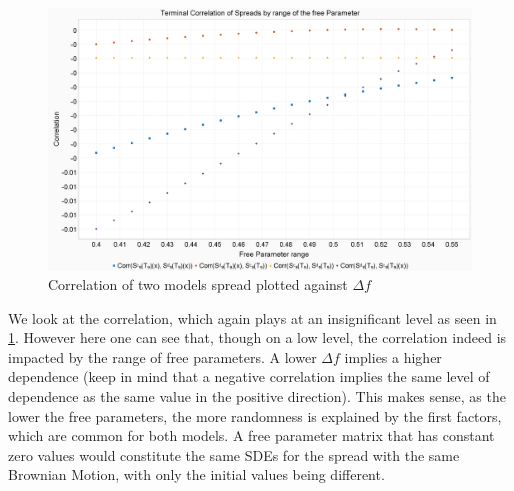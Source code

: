 \documentclass[12pt]{article}
\begin{document}
	\begin{figure}[h!]
		\centering
		\includegraphics[width=0.7\linewidth]{figures/Today/SpreadCorrelationByFreeParameters}
		\caption{Correlation of two models spread plotted against $\Delta f$}
		\label{fig:spreadcorrelationbyfreeparameters}
	\end{figure}
	We look at the correlation, which again plays at an insignificant level as seen in \cref{fig:spreadcorrelationbyfreeparameters}. However here one can see that, though on a low level, the correlation indeed is impacted by the range of free parameters. A lower $\Delta f$ implies a higher dependence (keep in mind that a negative correlation implies the same level of dependence as the same value in the positive direction). This makes sense, as the lower the free parameters, the more randomness is explained by the first factors, which are common for both models. A free parameter matrix that has constant zero values would constitute the same SDEs for the spread with the same Brownian Motion, with only the initial values being different.
	
		
	\pagebreak
\end{document}
